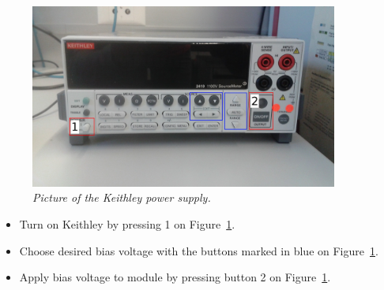 \documentclass[a4paper,12pt,twoside]{article}
\begin{document}
\begin{figure} [h!] \centering 
\includegraphics[width=0.9\textwidth, angle=0] {./Keithley.jpg}
\caption{\em  \label{Keithley}
Picture of the Keithley power supply.}
\end{figure}
\begin{itemize}
\item Turn on Keithley by pressing 1 on Figure~\ref{Keithley}.
\item Choose desired bias voltage with the buttons marked in blue on Figure~\ref{Keithley}.
\item Apply bias voltage to module by pressing button 2 on Figure~\ref{Keithley}.
\end{itemize}
\end{document}
